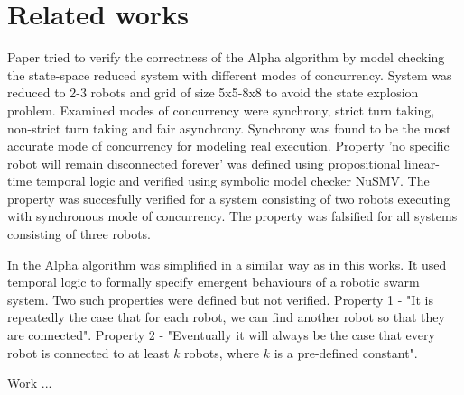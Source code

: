 \section{Related works}

Paper  \cite{Towards_Temporal_Verification_of_Emergent_Behaviours_in_Swarm_Robotic_Systems} tried to verify the correctness of the Alpha algorithm by model checking the state-space reduced system with different modes of concurrency. System was reduced to 2-3 robots and grid of size 5x5-8x8 to avoid the state explosion problem. Examined modes of concurrency were synchrony, strict turn taking, non-strict turn taking and fair asynchrony. Synchrony was found to be the most accurate mode of concurrency for modeling real execution. Property 'no specific robot will remain disconnected forever' was defined using propositional linear-time temporal logic and verified using symbolic model checker NuSMV. The property was succesfully verified for a system consisting of two robots executing with synchronous mode of concurrency. The property was falsified for all systems consisting of three robots.

In \cite{On_Formal_Specification_of_Emergent_Behaviours_in_Swarm_Robotic_Systems} the Alpha algorithm was simplified in a similar way as in this works. It used temporal logic to formally specify emergent behaviours of a robotic swarm system. Two such properties were defined but not verified. Property 1 - "It is repeatedly the case that for each robot, we can find another robot so that they are connected". Property 2 - "Eventually it will always be the case that every robot is connected to at least $k$ robots, where $k$ is a pre-defined constant".

Work \cite{Formal_Verification_of_Probabilistic_Swarm_Behaviours}...


